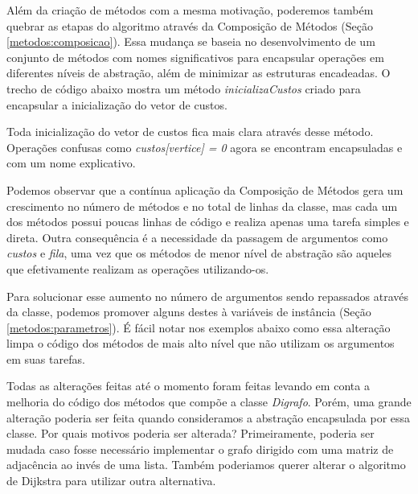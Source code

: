

Além da criação de métodos com a mesma motivação, poderemos também quebrar as etapas do algoritmo através da Composição 
de Métodos (Seção \ref{metodos:composicao}). Essa mudança se baseia no desenvolvimento de um conjunto de métodos com nomes 
significativos para encapsular operações em diferentes níveis de abstração, além de minimizar as estruturas encadeadas.
O trecho de código abaixo mostra um método \textit{inicializaCustos} criado para encapsular a inicialização do vetor de 
custos.



Toda inicialização do vetor de custos fica mais clara através desse método. Operações confusas como 
\textit{custos[vertice] = 0} agora se encontram encapsuladas e com um nome explicativo.

Podemos observar que a contínua aplicação da Composição de Métodos gera um crescimento no número de métodos e no total de 
linhas da classe, mas cada um dos métodos possui poucas linhas de código e realiza apenas uma tarefa simples e direta. 
Outra consequência é a necessidade da passagem de argumentos como \textit{custos} e \textit{fila}, uma vez que os métodos 
de menor nível de abstração são aqueles que efetivamente realizam as operações utilizando-os.

Para solucionar esse aumento no número de argumentos sendo repassados através da classe, podemos promover alguns destes à 
variáveis de instância (Seção \ref{metodos:parametros}). É fácil notar nos exemplos abaixo como essa alteração limpa o código 
dos métodos de mais alto nível que não utilizam os argumentos em suas tarefas.



Todas as alterações feitas até o momento foram feitas levando em conta a melhoria do código dos métodos que compõe a 
classe \textit{Digrafo}. Porém, uma grande alteração poderia ser feita quando consideramos a abstração encapsulada por essa classe.
Por quais motivos poderia ser alterada? Primeiramente, poderia ser mudada caso fosse necessário implementar o grafo 
dirigido com uma matriz de adjacência ao invés de uma lista. Também poderiamos querer alterar o algoritmo de Dijkstra 
para utilizar outra alternativa.

